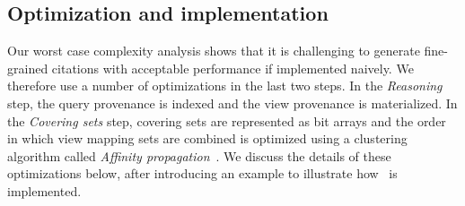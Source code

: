 \subsection{Optimization and implementation}
Our worst case complexity analysis shows that it is challenging to generate fine-grained citations with acceptable performance if implemented naively. We therefore use a number of optimizations in the last two steps.
In the {\em Reasoning} step, the query provenance is indexed and the view provenance is materialized. In the {\em Covering sets} step, covering sets are represented as bit arrays and the order in which view mapping sets are combined is optimized using a clustering algorithm called {\em Affinity propagation}~\cite{dueck2007non}. We discuss the details of these optimizations below, after introducing an example to illustrate how \provalg\ is implemented. 
